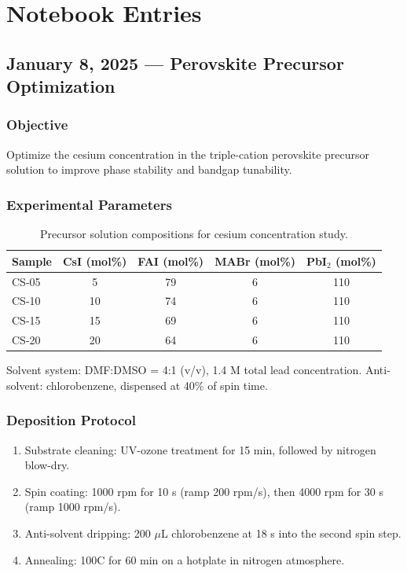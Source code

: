 \documentclass[
    language=english,
    doctype=research-notebook,
    institution=none,
]{../../omnilatex}
\begin{document}
\section{Notebook Entries}
\label{sec:entries}

\subsection{January 8, 2025 --- Perovskite Precursor Optimization}
\label{entry:jan08}

\subsubsection{Objective}
Optimize the cesium concentration in the triple-cation perovskite precursor
solution to improve phase stability and bandgap tunability.

\subsubsection{Experimental Parameters}
\begin{table}[htbp]
    \centering
    \caption{Precursor solution compositions for cesium concentration study.}
    \label{tab:jan08-params}
    \begin{tabular}{@{}lcccc@{}}
        \toprule
        Sample & CsI (mol\%) & FAI (mol\%) & MABr (mol\%) & PbI$_2$ (mol\%) \\
        \midrule
        CS-05  & 5           & 79          & 6            & 110              \\
        CS-10  & 10          & 74          & 6            & 110              \\
        CS-15  & 15          & 69          & 6            & 110              \\
        CS-20  & 20          & 64          & 6            & 110              \\
        \bottomrule
    \end{tabular}
\end{table}

Solvent system: DMF:DMSO = 4:1 (v/v), 1.4 M total lead concentration.
Anti-solvent: chlorobenzene, dispensed at 40\% of spin time.

\subsubsection{Deposition Protocol}
\begin{enumerate}
    \item Substrate cleaning: UV-ozone treatment for 15 min, followed by
          nitrogen blow-dry.
    \item Spin coating: 1000 rpm for 10 s (ramp 200 rpm/s), then 4000 rpm
          for 30 s (ramp 1000 rpm/s).
    \item Anti-solvent dripping: 200 $\mu$L chlorobenzene at 18 s into
          the second spin step.
    \item Annealing: 100\degree C for 60 min on a hotplate in nitrogen
          atmosphere.
\end{enumerate}
\end{document}

